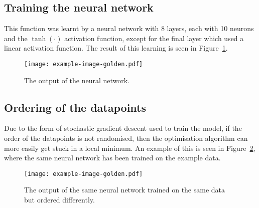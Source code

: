 \subsection{Training the neural network}

This function was learnt by a neural network with 8 layers, each with 10 neurons and the \(\tanh(\cdot)\) activation function, except for the final layer which used a linear activation function.
The result of this learning is seen in Figure~\ref{fig:ann-output}.

\begin{figure}[htbp]
	\centering
	\texttt{[image: example-image-golden.pdf]}
	\caption{The output of the neural network.}
	\label{fig:ann-output}
\end{figure}

\subsection{Ordering of the datapoints}

Due to the form of stochastic gradient descent used to train the model, if the order of the datapoints is not randomised, then the optimisation algorithm can more easily get stuck in a local minimum.
An example of this is seen in Figure~\ref{fig:ann-order}, where the same neural network has been trained on the example data.

\begin{figure}[htbp]
	\centering
	\texttt{[image: example-image-golden.pdf]}
	\caption{The output of the same neural network trained on the same data but ordered differently.}
	\label{fig:ann-order}
\end{figure}

